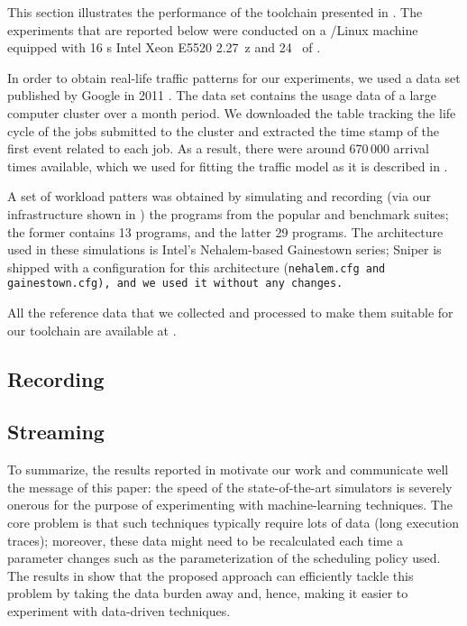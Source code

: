 This section illustrates the performance of the toolchain presented in
. The experiments that are reported below were conducted on a
/Linux machine equipped with 16 s Intel Xeon E5520 2.27~z
and 24~ of .

In order to obtain real-life traffic patterns for our experiments, we used a
data set published by Google in 2011 \cite{reiss2011}. The data set contains the
usage data of a large computer cluster over a month period. We downloaded the
table tracking the life cycle of the jobs submitted to the cluster and extracted
the time stamp of the first event related to each job. As a result, there were
around 670\,000 arrival times available, which we used for fitting the traffic
model as it is described in .

A set of workload patters was obtained by simulating and recording (via our
infrastructure shown in ) the programs from the popular
 \cite{bienia2011} and  \cite{cpu2006} benchmark
suites; the former contains 13 programs, and the latter 29 programs. The
architecture used in these simulations is Intel's Nehalem-based Gainestown
series; Sniper is shipped with a configuration for this architecture
(\tt{nehalem.cfg} and \tt{gainestown.cfg}), and we used it without any changes.

All the reference data that we collected and processed to make them suitable for
our toolchain are available at \cite{sources}.

\subsection{Recording}


\subsection{Streaming}


To summarize, the results reported in  motivate our work and
communicate well the message of this paper: the speed of the state-of-the-art
simulators is severely onerous for the purpose of experimenting with
machine-learning techniques. The core problem is that such techniques typically
require lots of data (long execution traces); moreover, these data might need to
be recalculated each time a parameter changes such as the parameterization of
the scheduling policy used. The results in  show that the
proposed approach can efficiently tackle this problem by taking the data burden
away and, hence, making it easier to experiment with data-driven techniques.
